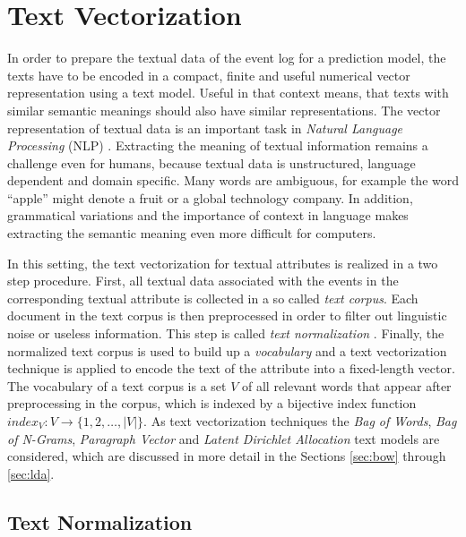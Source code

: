 \section{Text Vectorization}\label{sec:text}

In order to prepare the textual data of the event log for a prediction model, the texts have to be encoded in a compact, finite and useful numerical vector representation using a text model.
Useful in that context means, that texts with similar semantic meanings should also have similar representations.
The vector representation of textual data is an important task in \textit{Natural Language Processing} (NLP) \cite{DBLP:books/daglib/0001548}.
Extracting the meaning of textual information remains a challenge even for humans, because textual data is unstructured, language dependent and domain specific.
Many words are ambiguous, for example the word \enquote{apple} might denote a fruit or a global technology company.
In addition, grammatical variations and the importance of context in language makes extracting the semantic meaning even more difficult for computers.

In this setting, the text vectorization for textual attributes is realized in a two step procedure.
First, all textual data associated with the events in the corresponding textual attribute is collected in a so called \textit{text corpus}.
Each document in the text corpus is then preprocessed in order to filter out linguistic noise or useless information.
This step is called \textit{text normalization}  \cite{DBLP:books/lib/JurafskyM09}.
Finally, the normalized text corpus is used to build up a \textit{vocabulary} and a text vectorization technique is applied to encode the text of the attribute into a fixed-length vector.
The vocabulary of a text corpus is a set $V$ of all relevant words that appear after preprocessing in the corpus, which is indexed by a bijective index function $index_V \colon V \to \{1, 2, \dots, |V|\}$.
As text vectorization techniques the \textit{Bag of Words}, \textit{Bag of N-Grams}, \textit{Paragraph Vector} and \textit{Latent Dirichlet Allocation} text models are considered, which are discussed in more detail in the Sections \ref{sec:bow} through \ref{sec:lda}.

\subsection{Text Normalization}

